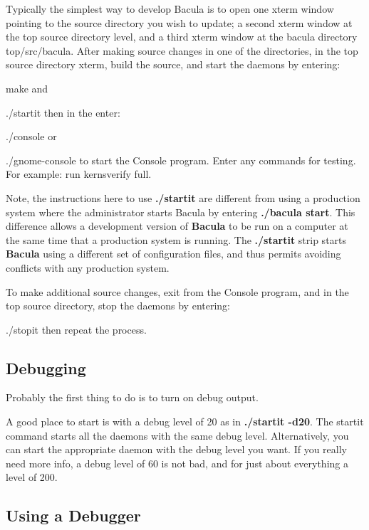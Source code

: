 Typically the simplest way to develop Bacula is to open one xterm window
pointing to the source directory you wish to update; a second xterm window at
the top source directory level, and a third xterm window at the bacula
directory \lt{}top\gt{}/src/bacula. After making source changes in one of the
directories, in the top source directory xterm, build the source, and start
the daemons by entering: 

make and 

./startit then in the enter: 

./console or 

./gnome-console to start the Console program. Enter any commands for testing.
For example: run kernsverify full. 

Note, the instructions here to use {\bf ./startit} are different from using a
production system where the administrator starts Bacula by entering {\bf
./bacula start}. This difference allows a development version of {\bf Bacula}
to be run on a computer at the same time that a production system is running.
The {\bf ./startit} strip starts {\bf Bacula} using a different set of
configuration files, and thus permits avoiding conflicts with any production
system. 

To make additional source changes, exit from the Console program, and in the
top source directory, stop the daemons by entering: 

./stopit then repeat the process. 

\subsection{Debugging}

Probably the first thing to do is to turn on debug output. 

A good place to start is with a debug level of 20 as in {\bf ./startit -d20}.
The startit command starts all the daemons with the same debug level.
Alternatively, you can start the appropriate daemon with the debug level you
want. If you really need more info, a debug level of 60 is not bad, and for
just about everything a level of 200. 

\subsection{Using a Debugger}

